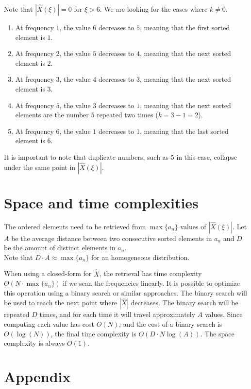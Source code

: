 \documentclass{article}
\begin{document}
Note that \(|\hat{X}(\xi)| = 0\) for \(\xi > 6\).
We are looking for the cases where \(k \neq 0\). \\
\begin{enumerate}
    \item At frequency \(1\), the value \(6\) decreases to \(5\), meaning that the first sorted element is \(1\).
    \item At frequency \(2\), the value \(5\) decreases to \(4\), meaning that the next sorted element is \(2\).
    \item At frequency \(3\), the value \(4\) decreases to \(3\), meaning that the next sorted element is \(3\).
    \item At frequency \(5\), the value \(3\) decreases to \(1\), meaning that the next sorted elements are the number \(5\)
    repeated two times (\(k=3-1=2\)).
    \item At frequency \(6\), the value \(1\) decreases to \(1\), meaning that the last sorted element is \(6\).
\end{enumerate}

It is important to note that duplicate numbers,
such as \(5\) in this case, collapse under the same
point in \(|\hat{X}(\xi)|\).

\section{Space and time complexities}

The ordered elements need to be retrieved from \(\max\{a_n\}\) values of
\(|\hat{X}(\xi)|\). Let \(A\) be the average distance between two consecutive sorted
elements in \(a_n\) and \(D\) be the amount of distinct elements in \(a_n\).\\
Note that \(D \cdot A \approx \max\{a_n\}\) for an homogeneous distribution.

When using a closed-form for \(\hat{X}\), the retrieval has time complexity
\(O(N \cdot \max\{a_n\})\) if we scan the frequencies linearly.
It is possible to optimize this operation using a binary search or similar approaches.
The binary search will be used to reach the next point where \(|\hat{X}|\) decreases.
The binary search will be repeated \(D\) times, and for each time
it will travel approximately \(A\) values. Since computing each value has cost \(O(N)\),
and the cost of a binary search is \(O(\log(N))\),
the final time complexity is \(O(D \cdot N \log(A))\).
The space complexity is always \(O(1)\).

\section{Appendix}
\end{document}
